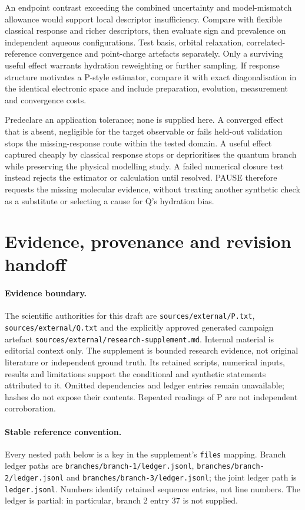 \documentclass{article}
\begin{document}
An endpoint contrast exceeding the combined uncertainty and model-mismatch allowance would support local descriptor insufficiency. Compare with flexible classical response and richer descriptors, then evaluate sign and prevalence on independent aqueous configurations. Test basis, orbital relaxation, correlated-reference convergence and point-charge artefacts separately. Only a surviving useful effect warrants hydration reweighting or further sampling. If response structure motivates a P-style estimator, compare it with exact diagonalisation in the identical electronic space and include preparation, evolution, measurement and convergence costs.

Predeclare an application tolerance; none is supplied here. A converged effect that is absent, negligible for the target observable or fails held-out validation stops the missing-response route within the tested domain. A useful effect captured cheaply by classical response stops or deprioritises the quantum branch while preserving the physical modelling study. A failed numerical closure test instead rejects the estimator or calculation until resolved. PAUSE therefore requests the missing molecular evidence, without treating another synthetic check as a substitute or selecting a cause for Q's hydration bias.

\appendix
\section{Evidence, provenance and revision handoff}

\paragraph{Evidence boundary.}
The scientific authorities for this draft are \texttt{sources/external/P.txt}, \texttt{sources/external/Q.txt} and the explicitly approved generated campaign artefact \texttt{sources/external/research-supplement.md}. Internal material is editorial context only. The supplement is bounded research evidence, not original literature or independent ground truth. Its retained scripts, numerical inputs, results and limitations support the conditional and synthetic statements attributed to it. Omitted dependencies and ledger entries remain unavailable; hashes do not expose their contents. Repeated readings of P are not independent corroboration.

\paragraph{Stable reference convention.}
Every nested path below is a key in the supplement's \texttt{files} mapping. Branch ledger paths are \texttt{branches/branch-1/ledger.jsonl}, \texttt{branches/branch-2/ledger.jsonl} and \texttt{branches/branch-3/ledger.jsonl}; the joint ledger path is \texttt{ledger.jsonl}. Numbers identify retained sequence entries, not line numbers. The ledger is partial: in particular, branch 2 entry 37 is not supplied.
\end{document}
